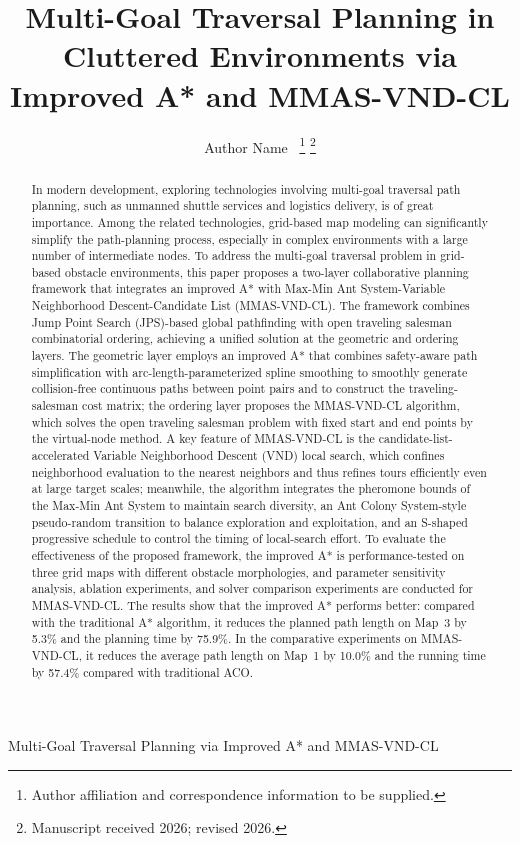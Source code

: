 \documentclass[lettersize,journal]{IEEEtran}
\begin{document}
\title{Multi-Goal Traversal Planning in Cluttered Environments via Improved A* and MMAS-VND-CL}

\author{Author Name~%
\thanks{Author affiliation and correspondence information to be supplied.}%
\thanks{Manuscript received 2026; revised 2026.}}

%
{Multi-Goal Traversal Planning via Improved A* and MMAS-VND-CL}

\maketitle

\begin{abstract}

In modern development, exploring technologies involving multi-goal traversal path planning, such as unmanned shuttle services and logistics delivery, is of great importance. Among the related technologies, grid-based map modeling can significantly simplify the path-planning process, especially in complex environments with a large number of intermediate nodes. To address the multi-goal traversal problem in grid-based obstacle environments, this paper proposes a two-layer collaborative planning framework that integrates an improved A* with Max-Min Ant System-Variable Neighborhood Descent-Candidate List (MMAS-VND-CL). The framework combines Jump Point Search (JPS)-based global pathfinding with open traveling salesman combinatorial ordering, achieving a unified solution at the geometric and ordering layers. The geometric layer employs an improved A* that combines safety-aware path simplification with arc-length-parameterized spline smoothing to smoothly generate collision-free continuous paths between point pairs and to construct the traveling-salesman cost matrix; the ordering layer proposes the MMAS-VND-CL algorithm, which solves the open traveling salesman problem with fixed start and end points by the virtual-node method. A key feature of MMAS-VND-CL is the candidate-list-accelerated Variable Neighborhood Descent (VND) local search, which confines neighborhood evaluation to the nearest neighbors and thus refines tours efficiently even at large target scales; meanwhile, the algorithm integrates the pheromone bounds of the Max-Min Ant System to maintain search diversity, an Ant Colony System-style pseudo-random transition to balance exploration and exploitation, and an S-shaped progressive schedule to control the timing of local-search effort. To evaluate the effectiveness of the proposed framework, the improved A* is performance-tested on three grid maps with different obstacle morphologies, and parameter sensitivity analysis, ablation experiments, and solver comparison experiments are conducted for MMAS-VND-CL. The results show that the improved A* performs better: compared with the traditional A* algorithm, it reduces the planned path length on Map~3 by 5.3\% and the planning time by 75.9\%. In the comparative experiments on MMAS-VND-CL, it reduces the average path length on Map~1 by 10.0\% and the running time by 57.4\% compared with traditional ACO.

\end{abstract}
\end{document}
